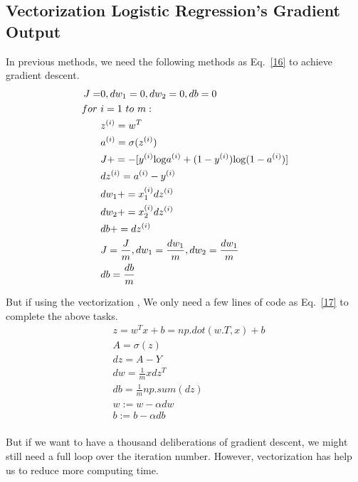 \documentclass[a4paper]{article}
\begin{document}
\subsection{Vectorization Logistic Regression's Gradient Output}
\par
In previous methods, we need the following methods as Eq.~\ref{16} to achieve gradient descent.
\begin{equation}\label{16}
\begin{split}
J=&0, dw_1=0, dw_2=0, db=0 \\
for ~&i=1~to~m:  \\
&z^{(i)}=w^T \\
&a^{(i)}=\sigma(z^{(i)}) \\
&J+=-[y^{(i)}{\rm log}a^{(i)}+(1-y^{(i)}){\rm log}(1-a^{(i)})] \\
&dz^{(i)}=a^{(i)}-y^{(i)} \\
&dw_1+=x_1^{(i)}dz^{(i)} \\
&dw_2+=x_2^{(i)}dz^{(i)} \\
&db+=dz^{(i)} \\
&J=\frac{J}{m}, dw_1=\frac{dw_1}{m}, dw_2=\frac{dw_1}{m} \\
&db=\frac{db}{m} \\
\end{split}
\end{equation}
\par
But if using the vectorization , We only need a few lines of code as Eq.~\ref{17} to complete the above tasks.
\begin{equation}\label{17}
\begin{split}
&z=w^Tx+b=np.dot(w.T, x)+b \\
&A=\sigma(z) \\
&dz=A-Y \\
&dw=\frac{1}{m}xdz^T \\
&db=\frac{1}{m}np.sum(dz) \\
&w:=w-\alpha dw \\
&b:=b-\alpha db \\
\end{split}
\end{equation}
\par
But if we want to have a thousand deliberations of gradient descent, we might still need a full loop over the iteration number. However, vectorization has help us to reduce more computing time.
\end{document}
